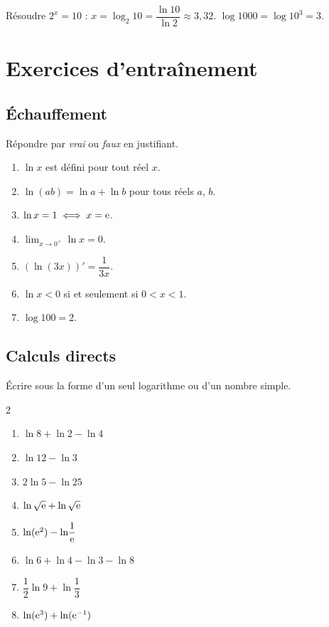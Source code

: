 \begin{exemple}
	Résoudre $2^{x}=10$ : $x=\log_2 10=\dfrac{\ln 10}{\ln 2}\approx 3{,}32$.
	\qquad
	$\log 1000=\log 10^{3}=3$.
\end{exemple}


\section{Exercices d'entraînement}

\subsection{Échauffement}

Répondre par \emph{vrai} ou \emph{faux} en justifiant.
\begin{enumerate}
	\item $\ln x$ est défini pour tout réel $x$.
	\item $\ln(a b)=\ln a+\ln b$ pour tous réels $a$, $b$.
	\item $\ln x=1\iff x=\mathrm{e}$.
	\item $\displaystyle\lim_{x\to 0^+}\ln x=0$.
	\item $(\ln(3x))'=\dfrac{1}{3x}$.
	\item $\ln x<0$ si et seulement si $0<x<1$.
	\item $\log 100=2$.
\end{enumerate}

\subsection{Calculs directs}

Écrire sous la forme d'un seul logarithme ou d'un nombre simple.
\begin{multicols}{2}
\begin{enumerate}
	\item $\ln 8+\ln 2-\ln 4$
	\item $\ln 12-\ln 3$
	\item $2\ln 5-\ln 25$
	\item $\ln\sqrt{\mathrm{e}}+\ln\sqrt{\mathrm{e}}$
	\item $\ln(\mathrm{e}^{2})-\ln\!\dfrac{1}{\mathrm{e}}$
	\item $\ln 6+\ln 4-\ln 3-\ln 8$
	\item $\dfrac12\ln 9+\ln\!\dfrac13$
	\item $\ln(\mathrm{e}^{3})+\ln(\mathrm{e}^{-1})$
\end{enumerate}
\end{multicols}

